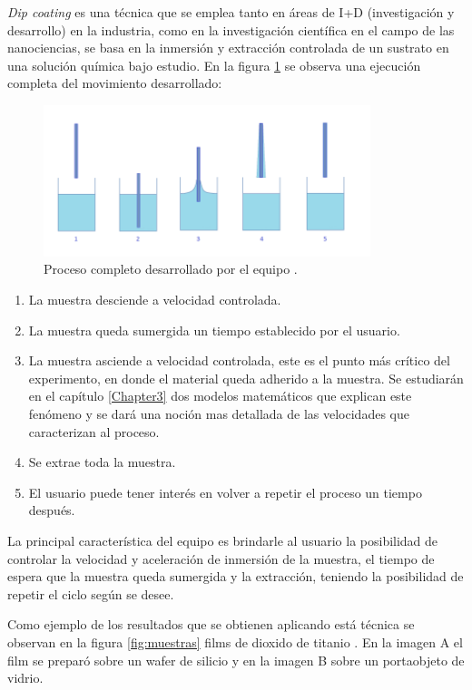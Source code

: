 \textit{Dip coating} es una técnica que se emplea tanto en áreas de I+D (investigación y desarrollo) en la industria, como en la investigación científica en el campo de las nanociencias, se basa en la inmersión y extracción  controlada de un sustrato en una solución química bajo estudio. En la figura \ref{fig:inmersion} se observa una ejecución completa del movimiento desarrollado:


\begin{figure}[htpb]
\centering 
\includegraphics[width=0.85\textwidth]{./Figures/dip-coating.png}
\caption{Proceso completo desarrollado por el equipo \protect\footnotemark.}
\label{fig:inmersion}
\end{figure}

\begin{enumerate}
\item La muestra desciende a velocidad controlada.
\item La muestra queda sumergida un tiempo establecido por el usuario.	
\item La muestra asciende a velocidad controlada, este es el punto más crítico del experimento, en donde el material queda adherido a la muestra. Se estudiarán en el capítulo \ref{Chapter3} dos modelos matemáticos que explican este fenómeno y se dará una noción mas detallada de las velocidades que caracterizan al proceso.
\item Se extrae toda la muestra.
\item El usuario puede tener interés en volver a repetir el proceso un tiempo después.
\end{enumerate} 
 
La principal característica del equipo es brindarle al usuario la posibilidad de controlar la velocidad y aceleración de inmersión de la muestra, el tiempo de espera que la muestra queda sumergida y la extracción, teniendo la posibilidad de repetir el ciclo según se desee.

Como ejemplo de los resultados que se obtienen aplicando está técnica se observan en la figura \ref{fig:muestras} films de dioxido de titanio . En la imagen A el film se preparó sobre un wafer de silicio y en la imagen B sobre un portaobjeto de vidrio.


